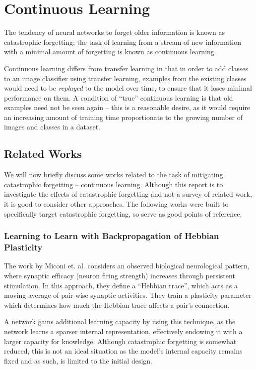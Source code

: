 \documentclass{report}
\begin{document}
	\section{Continuous Learning}
	The tendency of neural networks to forget older information is known as catastrophic forgetting; the task of learning from a stream of new information with a minimal amount of forgetting is known as continuous learning. \par
	Continuous learning differs from transfer learning in that in order to add classes to an image classifier using transfer learning, examples from the existing classes would need to be \emph{replayed} to the model over time, to ensure that it loses minimal performance on them. A condition of ``true'' continuous learning is that old examples need not be seen again -- this is a reasonable desire, as it would require an increasing amount of training time proportionate to the growing number of images and classes in a dataset. \par

	\subsection{Related Works}
	We will now briefly discuss some works related to the task of mitigating catastrophic forgetting -- continuous learning. Although this report is to investigate the effects of catastrophic forgetting and not a survey of related work, it is good to consider other approaches. The following works were built to specifically target catastrophic forgetting, so serve as good points of reference. \par
	
	\subsubsection{Learning to Learn with Backpropagation of Hebbian Plasticity}
	The work by Miconi et. al. \parencite{hebbian} considers an observed biological neurological pattern, where synaptic efficacy (neuron firing strength) increases through persistent stimulation. In this approach, they define a ``Hebbian trace'', which acts as a moving-average of pair-wise synaptic activities. They train a plasticity parameter which determines how much the Hebbian trace affects a pair's connection. \par
	A network gains additional learning capacity by using this technique, as the network learns a sparser internal representation, effectively endowing it with a larger capacity for knowledge. Although catastrophic forgetting is somewhat reduced, this is not an ideal situation as the model's internal capacity remains fixed and as such, is limited to the initial design. \par
	
\end{document}

